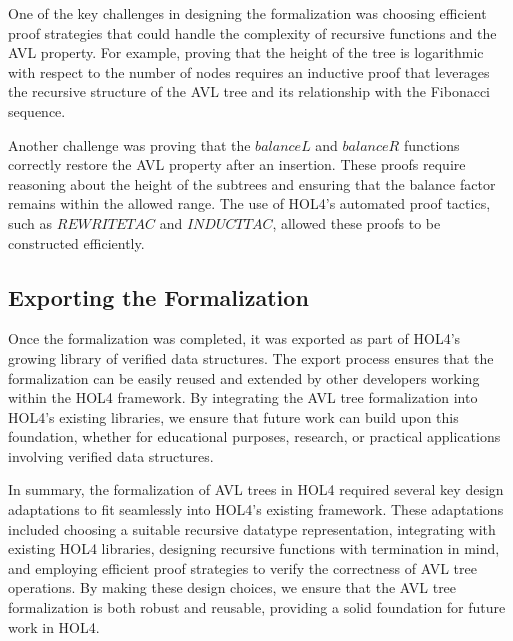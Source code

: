 One of the key challenges in designing the formalization was choosing efficient proof strategies that could handle the complexity of recursive functions and the AVL property. For example, proving that the height of the tree is logarithmic with respect to the number of nodes requires an inductive proof that leverages the recursive structure of the AVL tree and its relationship with the Fibonacci sequence.

Another challenge was proving that the \(balanceL\) and \(balanceR\) functions correctly restore the AVL property after an insertion. These proofs require reasoning about the height of the subtrees and ensuring that the balance factor remains within the allowed range. The use of HOL4’s automated proof tactics, such as \(REWRITE TAC\) and \(INDUCT TAC\), allowed these proofs to be constructed efficiently.

\subsection{Exporting the Formalization}

Once the formalization was completed, it was exported as part of HOL4’s growing library of verified data structures. The export process ensures that the formalization can be easily reused and extended by other developers working within the HOL4 framework. By integrating the AVL tree formalization into HOL4’s existing libraries, we ensure that future work can build upon this foundation, whether for educational purposes, research, or practical applications involving verified data structures.

In summary, the formalization of AVL trees in HOL4 required several key design adaptations to fit seamlessly into HOL4’s existing framework. These adaptations included choosing a suitable recursive datatype representation, integrating with existing HOL4 libraries, designing recursive functions with termination in mind, and employing efficient proof strategies to verify the correctness of AVL tree operations. By making these design choices, we ensure that the AVL tree formalization is both robust and reusable, providing a solid foundation for future work in HOL4.